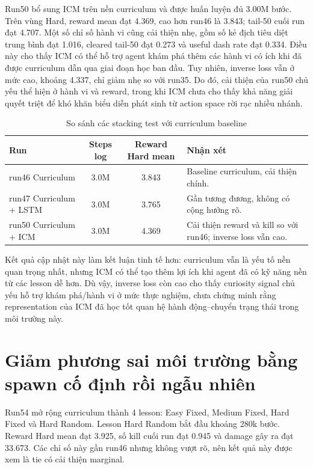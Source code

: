 Run50 bổ sung ICM trên nền curriculum và được huấn luyện đủ 3.00M bước. Trên vùng Hard, reward mean đạt 4.369, cao hơn run46 là 3.843; tail-50 cuối run đạt 4.707. Một số chỉ số hành vi cũng cải thiện nhẹ, gồm số kẻ địch tiêu diệt trung bình đạt 1.016, cleared tail-50 đạt 0.273 và useful dash rate đạt 0.334. Điều này cho thấy ICM có thể hỗ trợ agent khám phá thêm các hành vi có ích khi đã được curriculum dẫn qua giai đoạn học ban đầu. Tuy nhiên, inverse loss vẫn ở mức cao, khoảng 4.337, chỉ giảm nhẹ so với run35. Do đó, cải thiện của run50 chủ yếu thể hiện ở hành vi và reward, trong khi ICM chưa cho thấy khả năng giải quyết triệt để khó khăn biểu diễn phát sinh từ action space rời rạc nhiều nhánh.

\begin{table}[H]
    \centering
    \small
    \caption{So sánh các stacking test với curriculum baseline}
    \label{tab:stacking_tests}
    \begin{tabular}{|p{4.4cm}|c|c|p{4.8cm}|}
        \hline
        \textbf{Run} & \textbf{Steps log} & \textbf{Reward Hard mean} & \textbf{Nhận xét} \\
        \hline
        run46 Curriculum & 3.0M & 3.843 & Baseline curriculum, cải thiện chính. \\
        \hline
        run47 Curriculum + LSTM & 3.0M & 3.765 & Gần tương đương, không có cộng hưởng rõ. \\
        \hline
        run50 Curriculum + ICM & 3.0M & 4.369 & Cải thiện reward và kill so với run46; inverse loss vẫn cao. \\
        \hline
    \end{tabular}
\end{table}

Kết quả cập nhật này làm kết luận tinh tế hơn: curriculum vẫn là yếu tố nền quan trọng nhất, nhưng ICM có thể tạo thêm lợi ích khi agent đã có kỹ năng nền từ các lesson dễ hơn. Dù vậy, inverse loss còn cao cho thấy curiosity signal chủ yếu hỗ trợ khám phá/hành vi ở mức thực nghiệm, chưa chứng minh rằng representation của ICM đã học tốt quan hệ hành động--chuyển trạng thái trong môi trường này.

\section{Giảm phương sai môi trường bằng spawn cố định rồi ngẫu nhiên}

Run54 mở rộng curriculum thành 4 lesson: Easy Fixed, Medium Fixed, Hard Fixed và Hard Random. Lesson Hard Random bắt đầu khoảng 280k bước. Reward Hard mean đạt 3.925, số kill cuối run đạt 0.945 và damage gây ra đạt 33.673. Các chỉ số này gần run46 nhưng không vượt rõ, nên kết quả này được xem là tie có cải thiện marginal.

